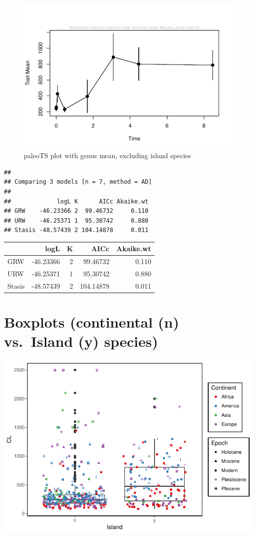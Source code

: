 \documentclass[]{article}
\begin{document}
\begin{figure}[htbp]
\centering
\includegraphics{MA_JJ_files/figure-latex/paleoTS plot with genus mean, excluding island species-1.pdf}
\caption{paleoTS plot with genus mean, excluding island species}
\end{figure}

\begin{verbatim}
## 
## Comparing 3 models [n = 7, method = AD]
## 
##             logL K      AICc Akaike.wt
## GRW    -46.23366 2  99.46732     0.110
## URW    -46.25371 1  95.30742     0.880
## Stasis -48.57439 2 104.14878     0.011
\end{verbatim}

\begin{longtable}[]{@{}lrrrr@{}}
\toprule
& logL & K & AICc & Akaike.wt\tabularnewline
\midrule
\endhead
GRW & -46.23366 & 2 & 99.46732 & 0.110\tabularnewline
URW & -46.25371 & 1 & 95.30742 & 0.880\tabularnewline
Stasis & -48.57439 & 2 & 104.14878 & 0.011\tabularnewline
\bottomrule
\end{longtable}

\newpage

\section{Boxplots (continental (n) vs.~Island (y)
species)}\label{boxplots-continental-n-vs.island-y-species}

\includegraphics{MA_JJ_files/figure-latex/unnamed-chunk-1-1.pdf}
\end{document}
